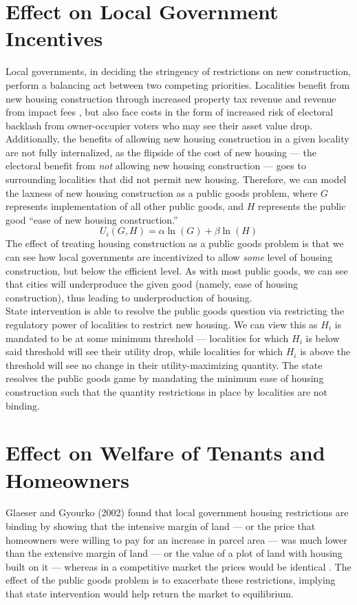 \documentclass[12pt]{extarticle}
\begin{document}
  \section*{Effect on Local Government Incentives}%
  Local governments, in deciding the stringency of restrictions on new construction, perform a balancing act between two competing priorities. Localities benefit from new housing construction through increased property tax revenue and revenue from impact fees \cite{impact_fees}, but also face costs in the form of increased risk of electoral backlash from owner-occupier voters who may see their asset value drop.\\

  Additionally, the benefits of allowing new housing construction in a given locality are not fully internalized, as the flipside of the cost of new housing --- the electoral benefit from \textit{not} allowing new housing construction --- goes to surrounding localities that did not permit new housing. Therefore, we can model the laxness of new housing construction as a public goods problem, where $G$ represents implementation of all other public goods, and $H$ represents the public good ``ease of new housing construction.''
  \[U_i(G,H) = \alpha \ln(G) + \beta \ln(H)\]
  The effect of treating housing construction as a public goods problem is that we can see how local governments are incentivized to allow \textit{some} level of housing construction, but below the efficient level. As with most public goods, we can see that cities will underproduce the given good (namely, ease of housing construction), thus leading to underproduction of housing.\\

  State intervention is able to resolve the public goods question via restricting the regulatory power of localities to restrict new housing. We can view this as $H_i$ is mandated to be at some minimum threshold --- localities for which $H_i$ is below said threshold will see their utility drop, while localities for which $H_i$ is above the threshold will see no change in their utility-maximizing quantity. The state resolves the public goods game by mandating the minimum ease of housing construction such that the quantity restrictions in place by localities are not binding.
  \section*{Effect on Welfare of Tenants and Homeowners}%
  Glaeser and Gyourko (2002) found that local government housing restrictions are binding by showing that the intensive margin of land --- or the price that homeowners were willing to pay for an increase in parcel area --- was much lower than the extensive margin of land --- or the value of a plot of land with housing built on it --- whereas in a competitive market the prices would be identical \cite{glaeser_gyourko_2002}. The effect of the public goods problem is to exacerbate these restrictions, implying that state intervention would help return the market to equilibrium.\\
\end{document}
